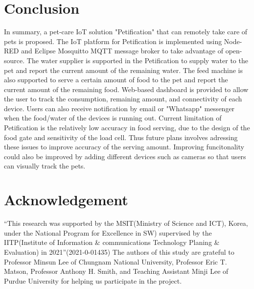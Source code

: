 ﻿\documentclass[conference]{IEEEtran}
\begin{document}
\section{Conclusion}
In summary, a pet-care IoT solution "Petification" that can remotely take care of pets is proposed.
The IoT platform for Petification is implemented using Node-RED and Eclipse Mosquitto MQTT message broker to take advantage of open-source.
The water supplier is supported in the Petification to supply water to the pet and report the current amount of the remaining water.
The feed machine is also supported to serve a certain amount of food to the pet and report the current amount of the remaining food.
Web-based dashboard is provided to allow the user to track the consumption, remaining amount, and connectivity of each device.
Users can also receive notification by email or "Whatsapp" messenger when the food/water of the devices is running out.
Current limitation of Petification is the relatively low accuracy in food serving, due to the design of the food gate and sensitivity of the load cell.
Thus future plans involves adressing these issues to improve accuracy of the serving amount.
Improving funcitonality could also be improved by adding different devices such as cameras so that users can visually track the pets.

\section{Acknowledgement}
“This research was supported by the MSIT(Ministry of Science and ICT), Korea, under the National Program for Excellence in SW) supervised by the IITP(Institute of Information \& communications Technology Planing \& Evaluation) in 2021”(2021-0-01435)
The authors of this study are grateful to Professor Minsun Lee of Chungnam National University, Professor Eric T. Matson, Professor Anthony H. Smith, and Teaching Assistant Minji Lee of Purdue University for helping us participate in the project.
\end{document}

